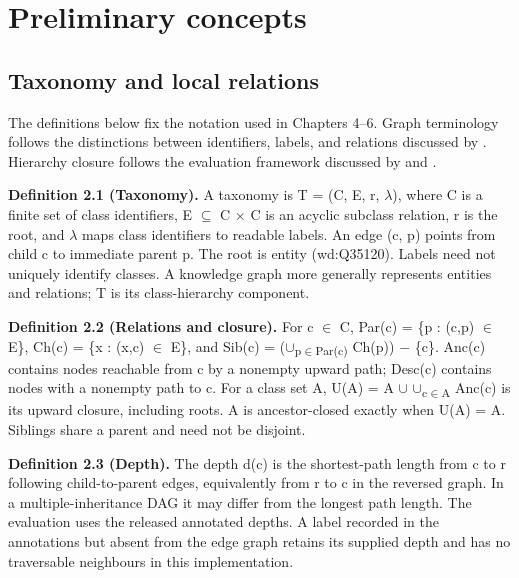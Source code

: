 \chapter{Preliminary concepts}

\FloatBarrier

\section{Taxonomy and local relations}

The definitions below fix the notation used in Chapters 4–6. Graph terminology follows the distinctions between identifiers, labels, and relations discussed by \citet{hogan2021}. Hierarchy closure follows the evaluation framework discussed by \citet{kosmopoulos2015} and \citet{plaud2024}.


{\small \textbf{Definition 2.1 (Taxonomy).} A taxonomy is T = (C, E, r, \ensuremath{\lambda}), where C is a finite set of class identifiers, E \ensuremath{\subseteq} C \ensuremath{\times} C is an acyclic subclass relation, r is the root, and \ensuremath{\lambda} maps class identifiers to readable labels. An edge (c, p) points from child c to immediate parent p. The root is entity (wd:Q35120). Labels need not uniquely identify classes. A knowledge graph more generally represents entities and relations; T is its class-hierarchy component.\par}


{\small \textbf{Definition 2.2 (Relations and closure).} For c \ensuremath{\in} C, Par(c) = \{p : (c,p) \ensuremath{\in} E\}, Ch(c) = \{x : (x,c) \ensuremath{\in} E\}, and Sib(c) = (\ensuremath{\cup}\textsubscript{p\ensuremath{\in}Par(c)} Ch(p)) \ensuremath{-} \{c\}. Anc(c) contains nodes reachable from c by a nonempty upward path; Desc(c) contains nodes with a nonempty path to c. For a class set A, U(A) = A \ensuremath{\cup} \ensuremath{\cup}\textsubscript{c\ensuremath{\in}A} Anc(c) is its upward closure, including roots. A is ancestor-closed exactly when U(A) = A. Siblings share a parent and need not be disjoint.\par}


{\small \textbf{Definition 2.3 (Depth).} The depth d(c) is the shortest-path length from c to r following child-to-parent edges, equivalently from r to c in the reversed graph. In a multiple-inheritance DAG it may differ from the longest path length. The evaluation uses the released annotated depths. A label recorded in the annotations but absent from the edge graph retains its supplied depth and has no traversable neighbours in this implementation.\par}


